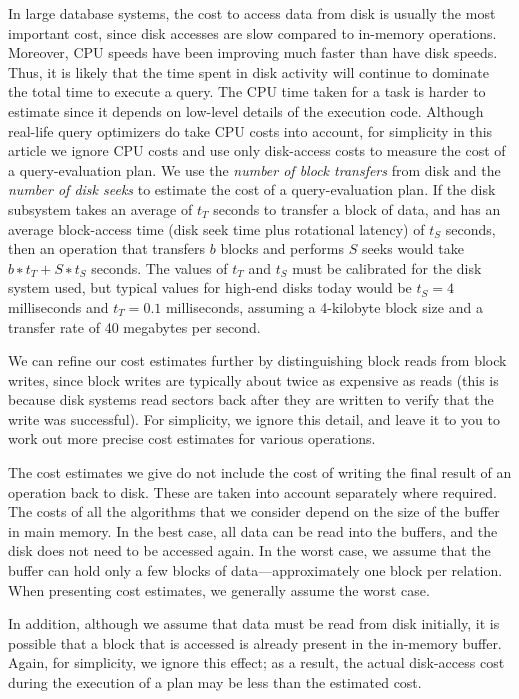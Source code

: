 \documentclass{vldb}
\begin{document}
In large database systems, the cost to access data from disk is usually the most important cost, since disk accesses are slow compared to in-memory operations.
Moreover, CPU speeds have been improving much faster than have disk speeds.
Thus, it is likely that the time spent in disk activity will continue to dominate the total time to execute a query. 
The CPU time taken for a task is harder to estimate since it depends on low-level details of the execution code. 
Although real-life query optimizers do take CPU costs into account, for simplicity in this article we ignore CPU costs and use only disk-access costs to measure the cost of a query-evaluation plan.
We use the \textit{number of block transfers} from disk and the \textit{number of disk seeks} to estimate the cost of a query-evaluation plan. 
If the disk subsystem takes an average of $t_T$ seconds to transfer a block of data, and has an average block-access time (disk seek time plus rotational latency) of $t_S$ seconds, then an operation that transfers $b$ blocks and performs $S$ seeks would take $b ∗ t_T + S ∗ t_S$ seconds. 
The values of $t_T$ and $t_S$ must be calibrated for the disk system used, but typical values for high-end disks today would be $t_S = 4$ milliseconds and $t_T = 0.1$ milliseconds, assuming a 4-kilobyte block size and a transfer rate of 40 megabytes per second.

We can refine our cost estimates further by distinguishing block reads from block writes, since block writes are typically about twice as expensive as reads
(this is because disk systems read sectors back after they are written to verify that the write was successful). 
For simplicity, we ignore this detail, and leave it to you to work out more precise cost estimates for various operations.

The cost estimates we give do not include the cost of writing the final result of an operation back to disk. 
These are taken into account separately where required.
The costs of all the algorithms that we consider depend on the size of the buffer in main memory. 
In the best case, all data can be read into the buffers, and the disk does not need to be accessed again. 
In the worst case, we assume that the buffer can hold only a few blocks of data—approximately one block per relation.
When presenting cost estimates, we generally assume the worst case.


In addition, although we assume that data must be read from disk initially, it is possible that a block that is accessed is already present in the in-memory buffer.
Again, for simplicity, we ignore this effect; as a result, the actual disk-access cost during the execution of a plan may be less than the estimated cost.
\end{document}
